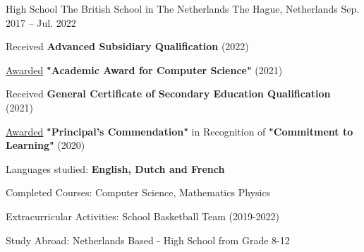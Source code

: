 

\begin{cventries}

  \cventry
    {High School} %
    {The British School in The Netherlands} %
    {The Hague, Netherlands} %
    {Sep. 2017 -- Jul. 2022} %
    {
      \begin{cvitems}
      \item {Received \textbf{Advanced Subsidiary Qualification} (2022)}
      \item {\underline{Awarded} \textbf{"Academic Award for Computer Science"} (2021)}
      \item {Received \textbf{General Certificate of Secondary Education Qualification} (2021)}
      \item {\underline{Awarded} \textbf{"Principal's Commendation"} in Recognition of \textbf{"Commitment to Learning"} (2020)}
      \item{Languages studied: \textbf{English, Dutch and French}}
      \item{Completed Courses: Computer Science, Mathematics Physics}
      \item{Extracurricular Activities: School Basketball Team (2019-2022)}
      \item{Study Abroad: Netherlands Based - High School from Grade 8-12}
      \end{cvitems}
    }


\end{cventries}


